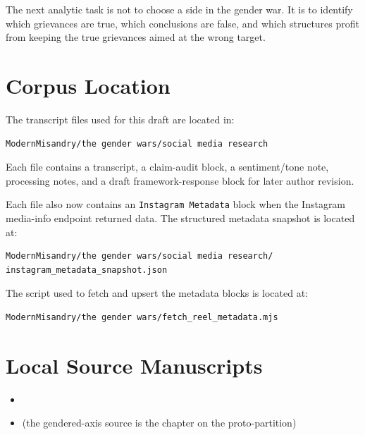 \documentclass[12pt]{article}
\begin{document}
The next analytic task is not to choose a side in the gender war. It is to identify which grievances are true, which conclusions are false, and which structures profit from keeping the true grievances aimed at the wrong target.

\appendix
\section{Corpus Location}

The transcript files used for this draft are located in:

\begin{verbatim}
ModernMisandry/the gender wars/social media research
\end{verbatim}

Each file contains a transcript, a claim-audit block, a sentiment/tone note, processing notes, and a draft framework-response block for later author revision.

Each file also now contains an \texttt{Instagram Metadata} block when the Instagram media-info endpoint returned data. The structured metadata snapshot is located at:

\begin{verbatim}
ModernMisandry/the gender wars/social media research/
instagram_metadata_snapshot.json
\end{verbatim}

The script used to fetch and upsert the metadata blocks is located at:

\begin{verbatim}
ModernMisandry/the gender wars/fetch_reel_metadata.mjs
\end{verbatim}

\section{Local Source Manuscripts}

\begin{itemize}
  \item {}
  \item {} (the gendered-axis source is the chapter on the proto-partition)
\end{itemize}
\end{document}
